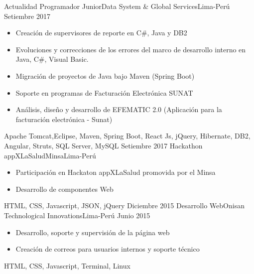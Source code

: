%
\begin{experiences}
  \experience
    {Actualidad}   { Programador Junior}{Data System \& Global Services}{Lima-Perú}
    {Setiembre 2017} {
                      \begin{itemize}
                        \item Creación de supervisores de reporte en C\#, Java y DB2  
                        \item Evoluciones y correcciones de los errores del marco de desarrollo interno en Java, C\#, Visual Basic.    
                        \item Migración de proyectos de Java bajo Maven (Spring Boot)   
                        \item Soporte en programas de Facturación Electrónica SUNAT
                        \item Análisis, diseño y desarrollo de EFEMATIC 2.0 (Aplicación para la facturación electrónica - Sunat)
                       
                        
                      \end{itemize}
                    }
                    {Apache Tomcat,Eclipse, Maven, Spring Boot, React Js, jQuery, Hibernate, DB2, Angular, Struts, SQL Server, MySQL}
 \emptySeparator
  \experience
    {Setiembre 2017} {Hackathon appXLaSalud}{Minsa}{Lima-Perú}
    {}    {
                      \begin{itemize}
                        \item Participación en Hackaton appXLaSalud promovida por el Minsa
                        \item Desarrollo de componentes Web                                                        
                      \end{itemize}
                    }
                    {HTML, CSS, Javascript, JSON, jQuery}
  \emptySeparator
  \experience
    {Diciembre 2015} {Desarrollo Web}{Onisan Technological Innovations}{Lima-Perú}
    {Junio 2015}    {
                      \begin{itemize}
                        \item Desarrollo, soporte y supervisión de la página web
                        \item Creación de correos para usuarios internos y soporte técnico                                                                    
                      \end{itemize}
                    }
                    {HTML, CSS, Javascript, Terminal, Linux}
                    

\end{experiences}
